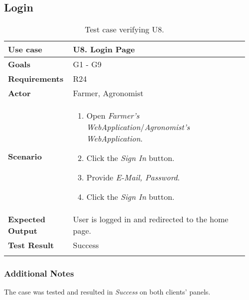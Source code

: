 \subsection{Login}
\begin{longtable}{@{}p{0.25\linewidth}p{0.71\linewidth}@{}}
	\toprule
	\textbf{Use case} & \textbf{U8.} Login Page\\
	\midrule
	\textbf{Goals} & G1 - G9\\
	\midrule
	\textbf{Requirements} & R24\\
	\midrule
	\textbf{Actor} & Farmer, Agronomist\\
	\midrule
	\textbf{Scenario} &
	\begin{enumerate}[leftmargin=.4cm,noitemsep,topsep=0pt,before=\vspace{-3mm},after=\vspace{-4mm}]
		\item Open \textit{Farmer's WebApplication}/\textit{Agronomist's WebApplication}.
		\item Click the \textit{Sign In} button.
		\item Provide \textit{E-Mail, Password}.
		\item Click the \textit{Sign In} button.
 	\end{enumerate}\\
	\midrule
	\textbf{Expected Output} & User is logged in and redirected to the home page.\\
	\midrule
	\textbf{Test Result} & Success\\
	\bottomrule
    \caption{Test case verifying U8.}
\end{longtable}

\subsubsection*{Additional Notes}
The case was tested and resulted in \textit{Success} on both clients' panels.


